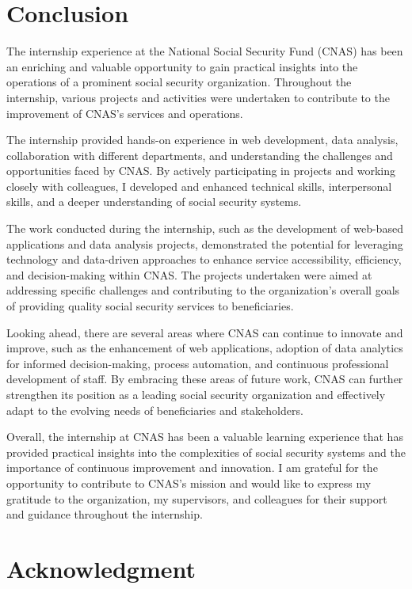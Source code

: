 \chapter*{Conclusion}
\label{chap:conclusion}

The internship experience at the National Social Security Fund (CNAS) has been an enriching and valuable opportunity to gain practical insights into the operations of a prominent social security organization. Throughout the internship, various projects and activities were undertaken to contribute to the improvement of CNAS's services and operations.

The internship provided hands-on experience in web development, data analysis, collaboration with different departments, and understanding the challenges and opportunities faced by CNAS. By actively participating in projects and working closely with colleagues, I developed and enhanced technical skills, interpersonal skills, and a deeper understanding of social security systems.

The work conducted during the internship, such as the development of web-based applications and data analysis projects, demonstrated the potential for leveraging technology and data-driven approaches to enhance service accessibility, efficiency, and decision-making within CNAS. The projects undertaken were aimed at addressing specific challenges and contributing to the organization's overall goals of providing quality social security services to beneficiaries.

Looking ahead, there are several areas where CNAS can continue to innovate and improve, such as the enhancement of web applications, adoption of data analytics for informed decision-making, process automation, and continuous professional development of staff. By embracing these areas of future work, CNAS can further strengthen its position as a leading social security organization and effectively adapt to the evolving needs of beneficiaries and stakeholders.

Overall, the internship at CNAS has been a valuable learning experience that has provided practical insights into the complexities of social security systems and the importance of continuous improvement and innovation. I am grateful for the opportunity to contribute to CNAS's mission and would like to express my gratitude to the organization, my supervisors, and colleagues for their support and guidance throughout the internship.

\chapter*{Acknowledgment}